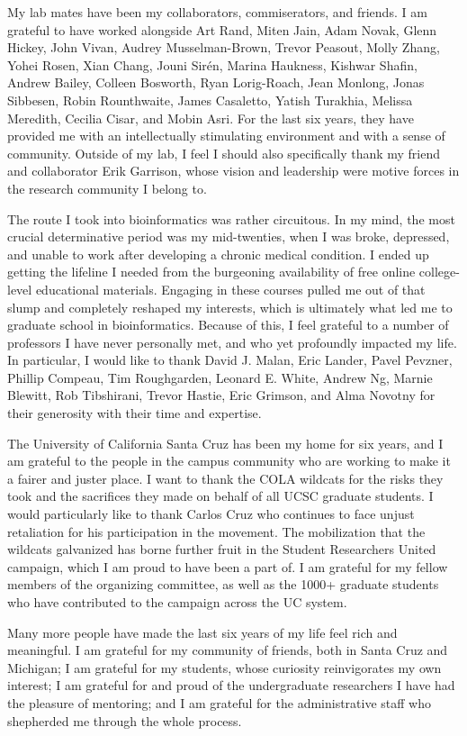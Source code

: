 \documentclass[11pt]{ucthesis}
\begin{document}
\begin{frontmatter}
\begin{acknowledgements}
My lab mates have been my collaborators, commiserators, and friends. I am grateful to have worked alongside Art Rand, Miten Jain, Adam Novak, Glenn Hickey, John Vivan, Audrey Musselman-Brown, Trevor Peasout, Molly Zhang, Yohei Rosen, Xian Chang, Jouni Sir{\'e}n, Marina Haukness, Kishwar Shafin, Andrew Bailey, Colleen Bosworth, Ryan Lorig-Roach, Jean Monlong, Jonas Sibbesen, Robin Rounthwaite, James Casaletto, Yatish Turakhia, Melissa Meredith, Cecilia Cisar, and Mobin Asri. For the last six years, they have provided me with an intellectually stimulating environment and with a sense of community. Outside of my lab, I feel I should also specifically thank my friend and collaborator Erik Garrison, whose vision and leadership were motive forces in the research community I belong to.

The route I took into bioinformatics was rather circuitous. In my mind, the most crucial determinative period was my mid-twenties, when I was broke, depressed, and unable to work after developing a chronic medical condition. I ended up getting the lifeline I needed from the burgeoning availability of free online college-level educational materials. Engaging in these courses pulled me out of that slump and completely reshaped my interests, which is ultimately what led me to graduate school in bioinformatics. Because of this, I feel grateful to a number of professors I have never personally met, and who yet profoundly impacted my life. In particular, I would like to thank David J. Malan, Eric Lander, Pavel Pevzner, Phillip Compeau, Tim Roughgarden, Leonard E. White, Andrew Ng, Marnie Blewitt, Rob Tibshirani, Trevor Hastie, Eric Grimson, and Alma Novotny for their generosity with their time and expertise.

The University of California Santa Cruz has been my home for six years, and I am grateful to the people in the campus community who are working to make it a fairer and juster place. I want to thank the COLA wildcats for the risks they took and the sacrifices they made on behalf of all UCSC graduate students. I would particularly like to thank Carlos Cruz who continues to face unjust retaliation for his participation in the movement. The mobilization that the wildcats galvanized has borne further fruit in the Student Researchers United campaign, which I am proud to have been a part of. I am grateful for my fellow members of the organizing committee, as well as the 1000+ graduate students who have contributed to the campaign across the UC system.

Many more people have made the last six years of my life feel rich and meaningful. I am grateful for my community of friends, both in Santa Cruz and Michigan; I am grateful for my students, whose curiosity reinvigorates my own interest; I am grateful for and proud of the undergraduate researchers I have had the pleasure of mentoring; and I am grateful for the administrative staff who shepherded me through the whole process.


\end{acknowledgements}
\end{frontmatter}
\end{document}
